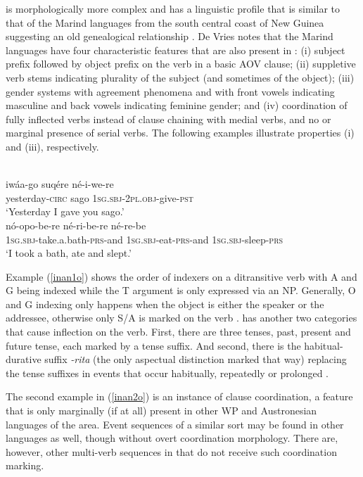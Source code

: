  is morphologically more complex and has a linguistic profile that is similar to that of the Marind languages from the south central coast of New Guinea suggesting an old genealogical relationship \citep[16]{devries2004}. De Vries notes that the Marind languages have four characteristic features that are also present in : (i) subject prefix followed by object prefix on the verb in a basic AOV clause; (ii) suppletive verb stems indicating plurality of the subject (and sometimes of the object); (iii) gender systems with agreement phenomena and with front vowels indicating masculine and back vowels indicating feminine gender; and (iv) coordination of fully inflected verbs instead of clause chaining with medial verbs, and no or marginal presence of serial verbs. The following examples illustrate properties (i) and (iii), respectively.

\ea
{}\\
\ea \label{inan1o}
\gll iwáa-go suqére né-i-we-re \\
yesterday-\textsc{circ} sago \textsc{1}\textsc{sg}.\textsc{sbj}-\textsc{2}\textsc{pl}.\textsc{obj}-give-\textsc{pst} \\
\glft `Yesterday I gave you sago.' \\ 
\ex \label{inan2o}
\gll nó-opo-be-re né-ri-be-re né-re-be \\ 
\textsc{1}\textsc{sg}.\textsc{sbj}-take.a.bath-\textsc{prs}-and \textsc{1}\textsc{sg}.\textsc{sbj}-eat-\textsc{prs}-and \textsc{1}\textsc{sg}.\textsc{sbj}-sleep-\textsc{prs} \\
\glft `I took a bath, ate and slept.'
\z
\z

Example (\ref{inan1o}) shows the order of indexers on a ditransitive verb with A and G being indexed while the T argument is only expressed via an NP. Generally, O and G indexing only happens when the object is either the speaker or the addressee, otherwise only S/A is marked on the verb \citep[35]{devries2004}.  has another two categories that cause inflection on the verb. First, there are three tenses, past, present and future tense, each marked by a tense suffix. And second, there is the habitual-durative suffix \textit{-rita} (the only aspectual distinction marked that way) replacing the tense suffixes in events that occur habitually, repeatedly or prolonged \citep[38]{devries2004}.

The second example in (\ref{inan2o}) is an instance of  clause coordination, a feature that is only marginally (if at all) present in other WP and Austronesian languages of the area. Event sequences of a similar sort may be found in other languages as well, though without overt coordination morphology. There are, however, other multi-verb sequences in  that do not receive such coordination marking.

